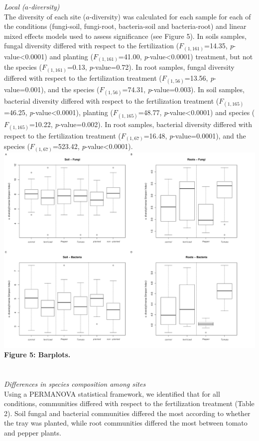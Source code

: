 \documentclass[11pt,]{article}
\begin{document}
\emph{Local (\(a\)-diversity)}\\
The diversity of each site (\(a\)-diversity) was calculated for each
sample for each of the conditions (fungi-soil, fungi-root, bacteria-soil
and bacteria-root) and linear mixed effects models used to assess
significance (see Figure 5). In soils samples, fungal diversity differed
with respect to the fertilization (\(F_{(1,161)}\)=14.35,
\emph{p}-value\textless{}0.0001) and planting (\(F_{(1,161)}\)=41.00,
\emph{p}-value\textless{}0.0001) treatment, but not the species
(\(F_{(1,161)}\)=0.13, \emph{p}-value=0.72). In root samples, fungal
diversity differed with respect to the fertilization treatment
(\(F_{(1,56)}\)=13.56, \emph{p}-value=0.001), and the species
(\(F_{(1,56)}\)=74.31, \emph{p}-value=0.003). In soil samples, bacterial
diversity differed with respect to the fertilization treatment
(\(F_{(1,165)}\)=46.25, \emph{p}-value\textless{}0.0001), planting
(\(F_{(1,165)}\)=48.77, \emph{p}-value\textless{}0.0001) and species
(\(F_{(1,165)}\)=10.22, \emph{p}-value=0.002). In root samples,
bacterial diversity differed with respect to the fertilization treatment
(\(F_{(1,67)}\)=16.48, \emph{p}-value=0.0001), and the species
(\(F_{(1,67)}\)=523.42, \emph{p}-value\textless{}0.0001). ~\\
\includegraphics[width=6.25000in]{../figures/Figure5_alpha.pdf}\\
\textbf{Figure 5: Barplots.}\\
\hspace*{0.333em}\\
\hspace*{0.333em}\\
\emph{Differences in species composition among sites}\\
Using a PERMANOVA statistical framework, we identified that for all
conditions, communities differed with respect to the fertilization
treatment (Table 2). Soil fungal and bacterial communities differed the
most according to whether the tray was planted, while root communities
differed the most between tomato and pepper plants.\\
\hspace*{0.333em}
\end{document}
